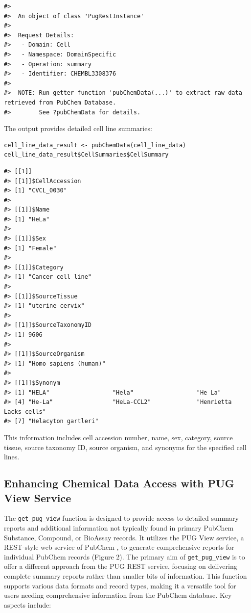 \begin{verbatim}
#> 
#>  An object of class 'PugRestInstance'
#> 
#>  Request Details:  
#>   - Domain: Cell
#>   - Namespace: DomainSpecific
#>   - Operation: summary
#>   - Identifier: CHEMBL3308376
#> 
#>  NOTE: Run getter function 'pubChemData(...)' to extract raw data retrieved from PubChem Database. 
#>        See ?pubChemData for details.
\end{verbatim}

The output provides detailed cell line summaries:

\begin{verbatim}
cell_line_data_result <- pubChemData(cell_line_data)
cell_line_data_result$CellSummaries$CellSummary
\end{verbatim}

\begin{verbatim}
#> [[1]]
#> [[1]]$CellAccession
#> [1] "CVCL_0030"
#> 
#> [[1]]$Name
#> [1] "HeLa"
#> 
#> [[1]]$Sex
#> [1] "Female"
#> 
#> [[1]]$Category
#> [1] "Cancer cell line"
#> 
#> [[1]]$SourceTissue
#> [1] "uterine cervix"
#> 
#> [[1]]$SourceTaxonomyID
#> [1] 9606
#> 
#> [[1]]$SourceOrganism
#> [1] "Homo sapiens (human)"
#> 
#> [[1]]$Synonym
#> [1] "HELA"                  "Hela"                  "He La"                
#> [4] "He-La"                 "HeLa-CCL2"             "Henrietta Lacks cells"
#> [7] "Helacyton gartleri"
\end{verbatim}

This information includes cell accession number, name, sex, category, source tissue, source taxonomy ID, source organism, and synonyms for the specified cell lines.

\hypertarget{enhancing-chemical-data-access-with-pug-view-service}{%
\subsection{Enhancing Chemical Data Access with PUG View Service}\label{enhancing-chemical-data-access-with-pug-view-service}}

The \texttt{get\_pug\_view} function is designed to provide access to detailed summary reports and additional information not typically found in primary PubChem Substance, Compound, or BioAssay records. It utilizes the PUG View service, a REST-style web service of PubChem \citep{kim2019pug}, to generate comprehensive reports for individual PubChem records (Figure 2). The primary aim of \texttt{get\_pug\_view} is to offer a different approach from the PUG REST service, focusing on delivering complete summary reports rather than smaller bits of information. This function supports various data formats and record types, making it a versatile tool for users needing comprehensive information from the PubChem database. Key aspects include:

